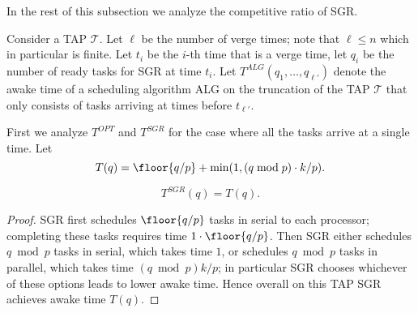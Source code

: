 In the rest of this subsection we analyze the competitive ratio of SGR.

Consider a TAP $\mathcal{T}$. Let $\ell$ be the number of verge
times; note that $\ell \le n$ which in particular is finite. Let
$t_i$ be the $i$-th time that is a verge time, let $q_i$ be the
number of ready tasks for SGR at time $t_i$. Let $T^{ALG}(q_1,
\ldots, q_{\ell'})$ denote the awake time of a scheduling algorithm
ALG on the truncation of the TAP $\mathcal{T}$ that only consists
of tasks arriving at times before $t_{\ell'}$.

First we analyze $T^{OPT}$ and $T^{SGR}$ for the case where all
the tasks arrive at a single time.
Let $$T(q) = \floor{q/p} + \min(1, (q\bmod p)\cdot k/p). $$

\begin{claim}
  \label{clm:sgr_single}
  $$T^{SGR}(q) = T(q).$$
\end{claim}
\begin{proof}
  SGR first schedules $\floor{q/p}$ tasks in serial to
  each processor; completing these tasks requires time $1\cdot \floor{q/p}$. 
  Then SGR either schedules $q\bmod p$ tasks
  in serial, which takes time $1$, or schedules $q\bmod p$
  tasks in parallel, which takes time $(q\bmod p)k/p$; in
  particular SGR chooses whichever of these options leads to
  lower awake time. Hence overall on this TAP
  SGR achieves awake time $T(q)$.
\end{proof}

